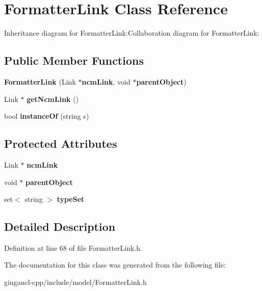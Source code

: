 \section{FormatterLink Class Reference}
\label{classbr_1_1pucrio_1_1telemidia_1_1ginga_1_1ncl_1_1model_1_1link_1_1FormatterLink}
Inheritance diagram for FormatterLink:Collaboration diagram for FormatterLink:\subsection*{Public Member Functions}
\begin{CompactItemize}
\item 
\textbf{FormatterLink} (Link $\ast${\bf ncmLink}, void $\ast${\bf parentObject})\label{classbr_1_1pucrio_1_1telemidia_1_1ginga_1_1ncl_1_1model_1_1link_1_1FormatterLink_cdca5d0e531aba915f1686862f3384ee}

\item 
Link $\ast$ \textbf{getNcmLink} ()\label{classbr_1_1pucrio_1_1telemidia_1_1ginga_1_1ncl_1_1model_1_1link_1_1FormatterLink_8dce47d6bfd7166660a04ff04f3b4043}

\item 
bool \textbf{instanceOf} (string s)\label{classbr_1_1pucrio_1_1telemidia_1_1ginga_1_1ncl_1_1model_1_1link_1_1FormatterLink_4081cb1ebb5adebc1d0858ff6f69af0d}

\end{CompactItemize}
\subsection*{Protected Attributes}
\begin{CompactItemize}
\item 
Link $\ast$ {\bf ncmLink}\label{classbr_1_1pucrio_1_1telemidia_1_1ginga_1_1ncl_1_1model_1_1link_1_1FormatterLink_3d5e7c50312bd90766d7076e1d08b526}

\item 
void $\ast$ {\bf parentObject}\label{classbr_1_1pucrio_1_1telemidia_1_1ginga_1_1ncl_1_1model_1_1link_1_1FormatterLink_51f8a50fee7eb22de566fedf31c772bc}

\item 
set$<$ string $>$ {\bf typeSet}\label{classbr_1_1pucrio_1_1telemidia_1_1ginga_1_1ncl_1_1model_1_1link_1_1FormatterLink_145b3afaa194308141d367cc1393d565}

\end{CompactItemize}


\subsection{Detailed Description}




Definition at line 68 of file FormatterLink.h.

The documentation for this class was generated from the following file:\begin{CompactItemize}
\item 
gingancl-cpp/include/model/FormatterLink.h\end{CompactItemize}
